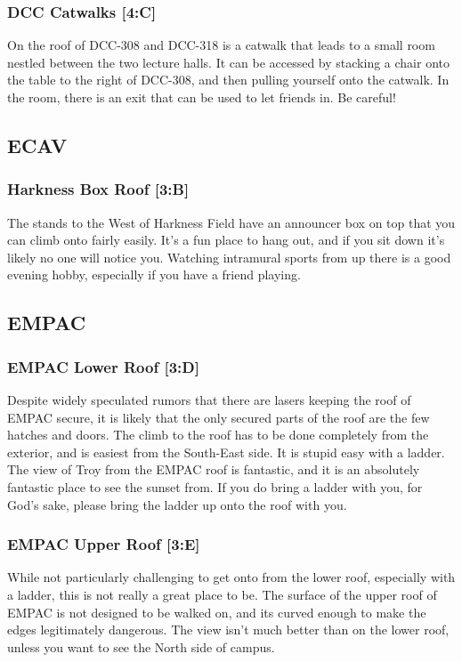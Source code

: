 \documentclass{article}
\begin{document}
\subsubsection{DCC Catwalks [4:C]}
On the roof of DCC-308 and DCC-318 is a catwalk that leads to a small room nestled between the two lecture halls. It can be accessed by stacking a chair onto the table to the right of DCC-308, and then pulling yourself onto the catwalk. In the room, there is an exit that can be used to let friends in. Be careful!

\pagebreak
\subsection{ECAV}
\subsubsection{Harkness Box Roof [3:B]}
The stands to the West of Harkness Field have an announcer box on top that you can climb onto fairly easily. It’s a fun place to hang out, and if you sit down it’s likely no one will notice you. Watching intramural sports from up there is a good evening hobby, especially if you have a friend playing.

\pagebreak
\subsection{EMPAC}
\subsubsection{EMPAC Lower Roof [3:D]}
Despite widely speculated rumors that there are lasers keeping the roof of EMPAC secure, it is likely that the only secured parts of the roof are the few hatches and doors. The climb to the roof has to be done completely from the exterior, and is easiest from the South-East side. It is stupid easy with a ladder. The view of Troy from the EMPAC roof is fantastic, and it is an absolutely fantastic place to see the sunset from. If you do bring a ladder with you, for God’s sake, please bring the ladder up onto the roof with you.
\subsubsection{EMPAC Upper Roof [3:E]}
While not particularly challenging to get onto from the lower roof, especially with a ladder, this is not really a great place to be. The surface of the upper roof of EMPAC is not designed to be walked on, and its curved enough to make the edges legitimately dangerous. The view isn’t much better than on the lower roof, unless you want to see the North side of campus.
\end{document}
